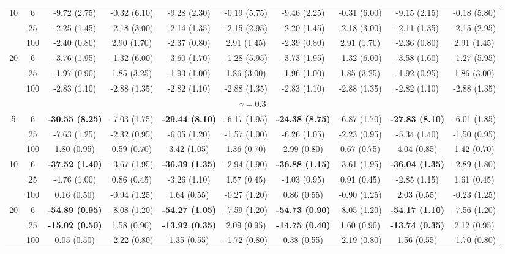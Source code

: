 \documentclass[
  man]{apa6}
\newenvironment{lltable}{\begin{landscape}\centering\begin{ThreePartTable}}{\end{ThreePartTable}\end{landscape}}
\begin{document}
\begin{lltable}
{\begin{longtable}{cccccccccc}
10 & 6 & -9.72 (2.75) & -0.32 (6.10) & -9.28 (2.30) & -0.19 (5.75) & -9.46 (2.25) & -0.31 (6.00) & -9.15 (2.15) & -0.18 (5.80)\\
 & 25 & -2.25 (1.45) & -2.18 (3.00) & -2.14 (1.35) & -2.15 (2.95) & -2.20 (1.45) & -2.18 (3.00) & -2.11 (1.35) & -2.15 (2.95)\\
 & 100 & -2.40 (0.80) & 2.90 (1.70) & -2.37 (0.80) & 2.91 (1.45) & -2.39 (0.80) & 2.91 (1.70) & -2.36 (0.80) & 2.91 (1.45)\\
20 & 6 & -3.76 (1.95) & -1.32 (6.00) & -3.60 (1.70) & -1.28 (5.95) & -3.73 (1.95) & -1.32 (6.00) & -3.58 (1.60) & -1.27 (5.95)\\
 & 25 & -1.97 (0.90) & 1.85 (3.25) & -1.93 (1.00) & 1.86 (3.00) & -1.96 (1.00) & 1.85 (3.25) & -1.92 (0.95) & 1.86 (3.00)\\
 & 100 & -2.83 (1.10) & -2.88 (1.35) & -2.82 (1.10) & -2.88 (1.35) & -2.83 (1.10) & -2.88 (1.35) & -2.82 (1.10) & -2.88 (1.35)\\
\multicolumn{10}{c}{$\gamma = 0.3$}\\
5 & 6 & \textbf{-30.55 (8.25)} & -7.03 (1.75) & \textbf{-29.44 (8.10)} & -6.17 (1.95) & \textbf{-24.38 (8.75)} & -6.87 (1.70) & \textbf{-27.83 (8.10)} & -6.01 (1.85)\\
 & 25 & -7.63 (1.25) & -2.32 (0.95) & -6.05 (1.20) & -1.57 (1.00) & -6.26 (1.05) & -2.23 (0.95) & -5.34 (1.40) & -1.50 (0.95)\\
 & 100 & 1.80 (0.95) & 0.59 (0.70) & 3.42 (1.05) & 1.36 (0.70) & 2.99 (0.80) & 0.67 (0.75) & 4.04 (0.85) & 1.42 (0.70)\\
10 & 6 & \textbf{-37.52 (1.40)} & -3.67 (1.95) & \textbf{-36.39 (1.35)} & -2.94 (1.90) & \textbf{-36.88 (1.15)} & -3.61 (1.95) & \textbf{-36.04 (1.35)} & -2.89 (1.80)\\
 & 25 & -4.76 (1.00) & 0.86 (0.45) & -3.26 (1.10) & 1.57 (0.45) & -4.03 (0.95) & 0.91 (0.45) & -2.85 (1.15) & 1.61 (0.45)\\
 & 100 & 0.16 (0.50) & -0.94 (1.25) & 1.64 (0.55) & -0.27 (1.20) & 0.86 (0.55) & -0.90 (1.25) & 2.03 (0.55) & -0.23 (1.25)\\
20 & 6 & \textbf{-54.89 (0.95)} & -8.08 (1.20) & \textbf{-54.27 (1.05)} & -7.59 (1.20) & \textbf{-54.73 (0.90)} & -8.05 (1.20) & \textbf{-54.17 (1.10)} & -7.56 (1.20)\\
 & 25 & \textbf{-15.02 (0.50)} & 1.58 (0.90) & \textbf{-13.92 (0.35)} & 2.09 (0.95) & \textbf{-14.75 (0.40)} & 1.60 (0.90) & \textbf{-13.74 (0.35)} & 2.12 (0.95)\\
 & 100 & 0.05 (0.50) & -2.22 (0.80) & 1.35 (0.55) & -1.72 (0.80) & 0.38 (0.55) & -2.19 (0.80) & 1.56 (0.55) & -1.70 (0.80)\\

\end{longtable}}
\end{lltable}
\end{document}
